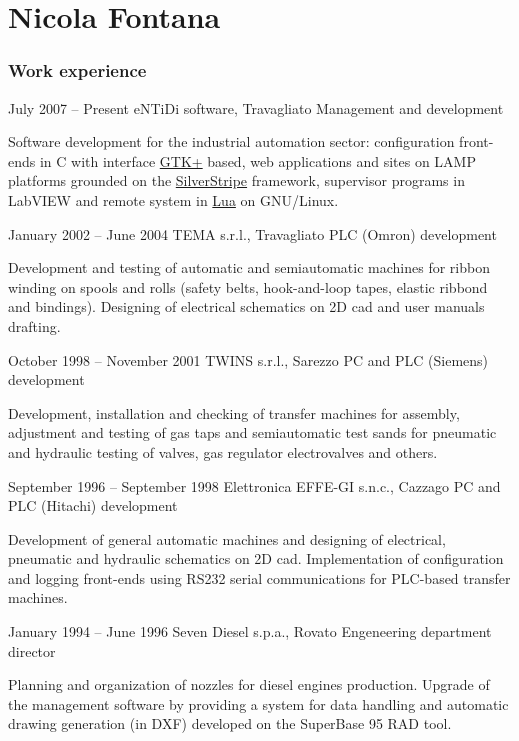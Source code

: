 \documentclass{tccv}
\begin{document}
\part{Nicola Fontana}

%
\begin{minipage}[t]{0.5\linewidth}
\vspace{0pt} %

\section{Work experience}

\begin{eventlist}

\item{July 2007 -- Present}
     {eNTiDi software, Travagliato}
     {Management and development}

Software development for the industrial automation sector: configuration
front-ends in C with interface \href{http://www.gtk.org/}{GTK+} based,
web applications and sites on LAMP platforms grounded on the
\href{http://www.silverstripe.org/}{SilverStripe} framework,
supervisor programs in LabVIEW and remote system in
\href{http://www.lua.org/}{Lua} on GNU/Linux.

\item{January 2002 -- June 2004}
     {TEMA s.r.l., Travagliato}
     {PLC (Omron) development}

Development and testing of automatic and semiautomatic machines for
ribbon winding on spools and rolls (safety belts, hook-and-loop tapes,
elastic ribbond and bindings). Designing of electrical schematics on
2D cad and user manuals drafting.

\item{October 1998 -- November 2001}
     {TWINS s.r.l., Sarezzo}
     {PC and PLC (Siemens) development}

Development, installation and checking of transfer machines for
assembly, adjustment and testing of gas taps and semiautomatic test
sands for pneumatic and hydraulic testing of valves, gas regulator
electrovalves and others.

\item{September 1996 -- September 1998}
     {Elettronica EFFE-GI s.n.c., Cazzago}
     {PC and PLC (Hitachi) development}

Development of general automatic machines and designing of electrical,
pneumatic and hydraulic schematics on 2D cad. Implementation of
configuration and logging front-ends using RS232 serial communications
for PLC-based transfer machines.

\item{January 1994 -- June 1996}
     {Seven Diesel s.p.a., Rovato}
     {Engeneering department director}

Planning and organization of nozzles for diesel engines production.
Upgrade of the management software by providing a system for data
handling and automatic drawing generation (in DXF) developed on the
SuperBase 95 RAD tool.

\end{eventlist}
\end{minipage}
\end{document}
